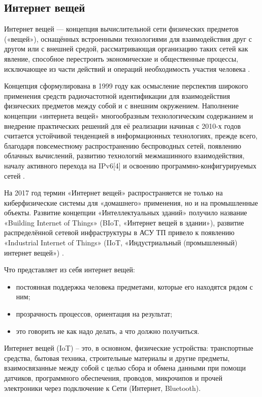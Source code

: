 \subsection{Интернет вещей}
\label{sec:subject:iot}

Интернет вещей — концепция вычислительной сети физических предметов («вещей»), оснащённых встроенными технологиями для взаимодействия друг с другом или с внешней средой, рассматривающая организацию таких сетей как явление, способное перестроить экономические и общественные процессы, исключающее из части действий и операций необходимость участия человека \cite{wiki_iot}.

Концепция сформулирована в 1999 году как осмысление перспектив широкого применения средств радиочастотной идентификации для взаимодействия физических предметов между собой и с внешним окружением. Наполнение концепции «интернета вещей» многообразным технологическим содержанием и внедрение практических решений для её реализации начиная с 2010-х годов считается устойчивой тенденцией в информационных технологиях, прежде всего, благодаря повсеместному распространению беспроводных сетей, появлению облачных вычислений, развитию технологий межмашинного взаимодействия, началу активного перехода на IPv6[4] и освоению программно-конфигурируемых сетей \cite{wiki_iot}.

На 2017 год термин «Интернет вещей» распространяется не только на киберфизические системы для «домашнего» применения, но и на промышленные объекты. Развитие концепции «Интеллектуальных зданий» получило название «Building Internet of Things» (BIoT, «Интернет вещей в здании»), развитие распределённой сетевой инфраструктуры в АСУ ТП привело к появлению «Industrial Internet of Things» (IIoT, «Индустриальный (промышленный) интернет вещей») \cite{wiki_iot}.

Что представляет из себя интернет вещей:
\begin{itemize}
	\item постоянная поддержка человека предметами, которые его находятся рядом с ним;
	\item прозрачность процессов, ориентация на результат;
	\item это говорить не как надо делать, а что должно получиться.
\end{itemize}

Интернет вещей (IoT) – это, в основном, физические устройства: транспортные средства, бытовая техника, строительные материалы и другие предметы, взаимосвязанные между собой с целью сбора и обмена данными при помощи датчиков, программного обеспечения, проводов, микрочипов и прочей электроники через подключение к Сети (Интернет, Bluetooth).

